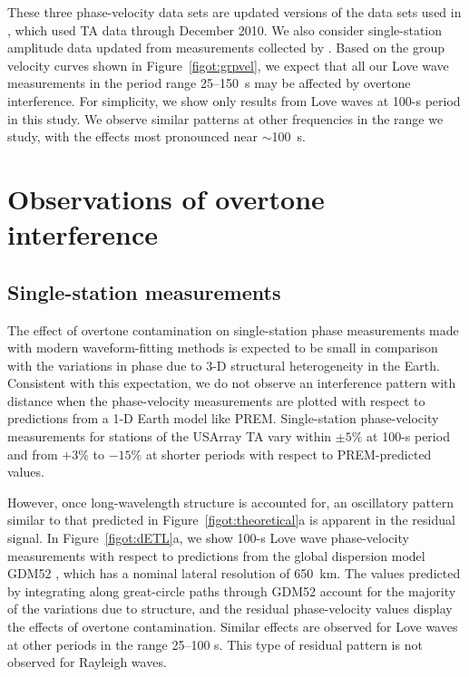 \documentclass[12pt,oneside]{book}
\begin{document}
These three phase-velocity data sets are updated versions of the data sets used in \citet{Fosteretal2014}, which used TA data through December 2010. We also consider single-station amplitude data updated from measurements collected by \citet{EddyEkstrom2014}. Based on the group velocity curves shown in Figure~\ref{figot:grpvel}, we expect that all our Love wave measurements in the period range 25--150~s may be affected by overtone interference. For simplicity, we show only results from Love waves at 100-s period in this study. We observe similar patterns at other frequencies in the range we study, with the effects most pronounced near $\sim$100~s. 

\section{Observations of overtone interference}
\subsection{Single-station measurements}
The effect of overtone contamination on single-station phase measurements made with modern waveform-fitting methods \citep[e.g.,][]{Trampert1995, Ekstrom1997} is expected to be small in comparison with the variations in phase due to 3\nobreakdash-D structural heterogeneity in the Earth. Consistent with this expectation, we do not observe an interference pattern with distance when the phase-velocity measurements are plotted with respect to predictions from a 1\nobreakdash-D Earth model like PREM. Single-station phase-velocity measurements for stations of the USArray TA vary within $\pm5\%$ at 100-s period and from $+3\%$ to $-15\%$ at shorter periods with respect to PREM-predicted values.   

However, once long-wavelength structure is accounted for, an oscillatory pattern similar to that predicted in Figure~\ref{figot:theoretical}a is apparent in the residual signal. In Figure~\ref{figot:dETL}a, we show 100-s Love wave phase-velocity measurements with respect to predictions from the global dispersion model GDM52 \citep{Ekstrom2011}, which has a nominal lateral resolution of 650~km. The values predicted by integrating along great-circle paths through GDM52 account for the majority of the variations due to structure, and the residual phase-velocity values display the effects of overtone contamination. Similar effects are observed for Love waves at other periods in the range 25--100 s. This type of residual pattern is not observed for Rayleigh waves. 
\end{document}
